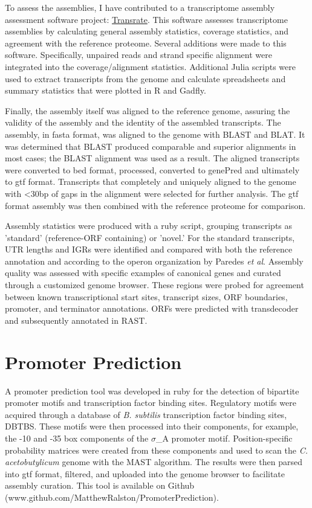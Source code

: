 To assess the assemblies, I have contributed to a transcriptome assembly assessment software project: \href{https://github.com/MatthewRalston/transrate}{Transrate}. This software assesses transcriptome assemblies by calculating general assembly statistics, coverage statistics, and agreement with the reference proteome. Several additions were made to this software. Specifically, unpaired reads and strand specific alignment were integrated into the coverage/alignment statistics. Additional Julia scripts were used to extract transcripts from the genome and calculate spreadsheets and summary statistics that were plotted in R and Gadfly.

Finally, the assembly itself was aligned to the reference genome, assuring the validity of the assembly and the identity of the assembled transcripts. The assembly, in fasta format, was aligned to the genome with BLAST\cite{184} and BLAT.\cite{183} It was determined that BLAST produced comparable and superior alignments in most cases; the BLAST alignment was used as a result. The aligned transcripts were converted to bed format, processed, converted to genePred and ultimately to gtf format. Transcripts that completely and uniquely aligned to the genome with \textless 30bp of gaps in the alignment were selected for further analysis. The gtf format assembly was then combined with the reference proteome for comparison. 

Assembly statistics were produced with a ruby script, grouping transcripts as 'standard' (reference-ORF containing) or 'novel.' For the standard transcripts, UTR lengths and IGRs were identified and compared with both the reference annotation and according to the operon organization by Paredes \textit{et al}.\cite{188}
Assembly quality was assessed with specific examples of canonical genes and curated through a customized genome browser. These regions were probed for agreement between known transcriptional start sites, transcript sizes, ORF boundaries, promoter, and terminator annotations.
ORFs were predicted with transdecoder and subsequently annotated in RAST.

\section{Promoter Prediction}
A promoter prediction tool was developed in ruby for the detection of bipartite promoter motifs and transcription factor binding sites. Regulatory motifs were acquired through a database of \textit{B. subtilis} transcription factor binding sites, DBTBS.\cite{189} These motifs were then processed into their components, for example, the -10 and -35 box components of the $\sigma$_{A} promoter motif. Position-specific probability matrices were created from these components and used to scan the \textit{C. acetobutylicum} genome with the MAST algorithm.\cite{5} The results were then parsed into gtf format, filtered, and uploaded into the genome browser to facilitate assembly curation. This tool is available on Github (www.github.com/MatthewRalston/PromoterPrediction).

